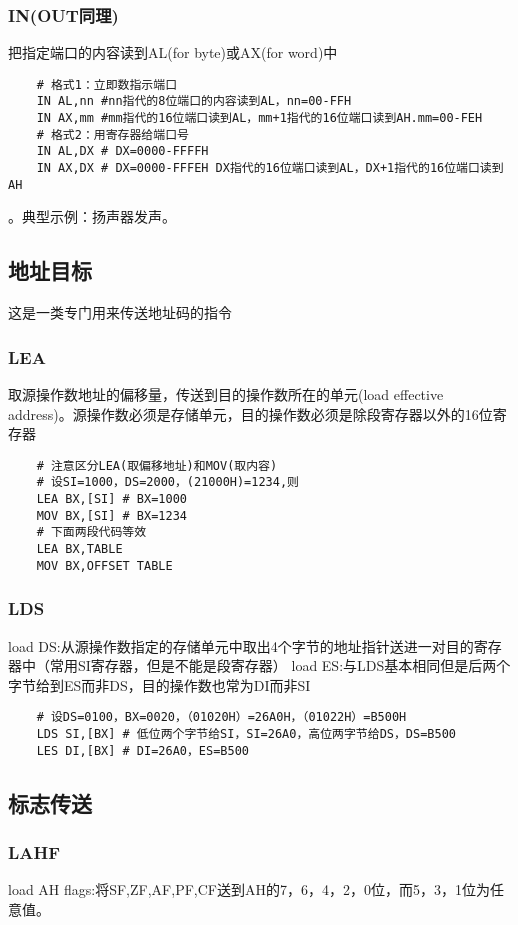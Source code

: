 \subsubsection{IN(OUT同理)}
把指定端口的内容读到AL(for byte)或AX(for word)中
\begin{lstlisting}
    # 格式1：立即数指示端口
    IN AL,nn #nn指代的8位端口的内容读到AL，nn=00-FFH
    IN AX,mm #mm指代的16位端口读到AL，mm+1指代的16位端口读到AH.mm=00-FEH
    # 格式2：用寄存器给端口号
    IN AL,DX # DX=0000-FFFFH
    IN AX,DX # DX=0000-FFFEH DX指代的16位端口读到AL，DX+1指代的16位端口读到AH
\end{lstlisting}
{\color{red}{当口地址大于FFH时，必须用格式2}}。典型示例：扬声器发声。
\subsection{地址目标}
这是一类专门用来传送地址码的指令
\subsubsection{LEA}
取源操作数地址的偏移量，传送到目的操作数所在的单元(load effective address)。{\color{red}源操作数必须是存储单元，目的操作数必须是除段寄存器以外的16位寄存器}
\begin{lstlisting}
    # 注意区分LEA(取偏移地址)和MOV(取内容)
    # 设SI=1000，DS=2000，(21000H)=1234,则
    LEA BX,[SI] # BX=1000
    MOV BX,[SI] # BX=1234
    # 下面两段代码等效
    LEA BX,TABLE
    MOV BX,OFFSET TABLE
\end{lstlisting}
\subsubsection{LDS}
load DS:从源操作数指定的存储单元中取出4个字节的地址指针送进一对目的寄存器中（常用SI寄存器，但是不能是段寄存器）
load ES:与LDS基本相同但是后两个字节给到ES而非DS，目的操作数也常为DI而非SI
\begin{lstlisting}
    # 设DS=0100，BX=0020，（01020H）=26A0H，（01022H）=B500H
    LDS SI,[BX] # 低位两个字节给SI，SI=26A0，高位两字节给DS，DS=B500
    LES DI,[BX] # DI=26A0，ES=B500
\end{lstlisting}
\subsection{标志传送}
\subsubsection{LAHF}
load AH flags:将SF,ZF,AF,PF,CF送到AH的7，6，4，2，0位，而5，3，1位为任意值。
